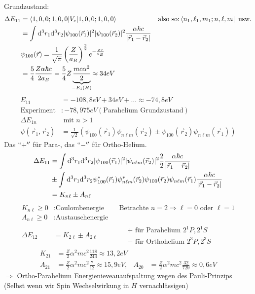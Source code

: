 Grundzustand:
	\begin{align*}
		\Delta E_{11} &=
		\braket{ 1, 0, 0 ; 1, 0, 0| V_e | 1, 0 , 0; 1, 0 ,0 } & 
		&\text{also so:}\bra{n_1, \ell_1, m_1; n , \ell, m} \text{ usw.}\\
		&= \int \diff^3r_1 \diff^3r_2 |\psi_{100} (\vec{r}_1)|^2 |\psi_{100}(\vec{r}_2)|^2
		\frac{\alpha \hbar c}{|\vec{r}_1 - \vec{r}_2|} \\
		&\psi_{100} (\vec{r}) = \frac{1}{\sqrt{\pi}} 
		\left(\frac{Z}{a_B}\right)^{\frac{3}{2}} e^{-\frac{Zr}{a_B}}\\
		&= \frac{5}{4} \frac{Z \alpha \hbar c}{2 a_B} 
		= \frac{5}{4} Z \underbrace{\frac{mc\alpha^2}{2}}_{\mathclap{-E_1(H)}} 
		\approx 34 eV
	\end{align*}
	\begin{align*}
		E_{11} &= -108,8 eV + 34 eV + \ldots \approx - 74,8 eV \\
		\text{Experiment} &: -78,975eV (\text{Parahelium Grundzustand}) \\
		\Delta E_{1n} &\text{ mit } n>1 \\
		\psi (\vec{r}_1, \vec{r}_2) 
		&= \frac{1}{\sqrt{2}}
		\left( \psi_{100}(\vec{r}_1) \psi_{n \ell m}(\vec{r}_2) 
		\pm \psi_{100}(\vec{r}_2) \psi_{n \ell m} (\vec{r}_1) \right)
	\end{align*}
Das $``+''$ für Para-, das $``-''$ für Ortho-Helium.
	\begin{align*}
		\Delta E_{11} &=
		\int \mathrm{d}^3 r_1 \mathrm{d}^3 r_2 |\psi_{100} (\vec{r}_1)|^2 |\psi_{n \ell m} (\vec{r}_2)|^2
		\frac{2}{2} \frac{\alpha \hbar c}{|\vec{r}_1 - \vec{r}_2|} \\
		&\pm \int \mathrm{d}^3 r_1 \mathrm{d}^3 r_2 \psi_{100}^* (\vec{r}_1) \psi_{n \ell m}^* (\vec{r}_2)
		\psi_{100} (\vec{r}_2) \psi_{n \ell m} (\vec{r}_1)
		\frac{\alpha \hbar c}{|\vec{r}_1 - \vec{r}_2|} \\
		&= K_{n \ell} \pm A_{n \ell}
	\end{align*}
	\begin{align*}
		K_{n \ell} \geq 0 &: \text{Coulombenergie} & 
		&\text{Betrachte } n=2 \Rightarrow \ell = 0 \text{ oder } \ell = 1\\
		A_{n \ell} \geq 0 &: \text{Austauschenergie} \\
		\Delta E_{12} &= K_{2 \ell} \pm A_{2 \ell} &
		&\begin{aligned}
			&+ \text{ für Parahelium } 2^1 P, 2^1 S \\
			&- \text{ für Orthohelium } 2^3 P, 2^3 S
		\end{aligned}
	\end{align*}
	\begin{align*}
		K_{21} &= \frac{Z}{2} \alpha^2 m c^2 \frac{118}{243} \approx 13,2 eV \\
		A_{21} &= \frac{Z}{2} \alpha^2 m c^2 \frac{7}{12} \approx 15,9 eV
		,& A_{20} &= \frac{Z}{2} \alpha^2 m c^2 \frac{32}{729} \approx 0,6 eV
	\end{align*}
$\Rightarrow$ Ortho-Parahelium Energienieveauaufspaltung wegen des Pauli-Prinzips (Selbst wenn wir Spin Wechselwirkung in $H$ vernachlässigen) 

